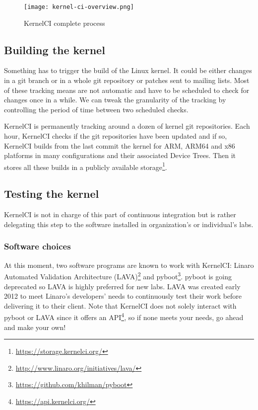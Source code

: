 \begin{figure}[H]
  \texttt{[image: kernel-ci-overview.png]}
  \caption{KernelCI complete process}
\end{figure}

\subsection{Building the kernel}

Something has to trigger the build of the Linux kernel. It could be either changes in a git branch or in a whole git repository or patches sent to mailing lists. Most of these tracking means are not automatic and have to be scheduled to check for changes once in a while. We can tweak the granularity of the tracking by controlling the period of time between two scheduled checks.

KernelCI is permanently tracking around a dozen of kernel git repositories. Each hour, KernelCI checks if the git repositories have been updated and if so, KernelCI builds from the last commit the kernel for ARM, ARM64 and x86 platforms in many configurations and their associated Device Trees. Then it stores all these builds in a publicly available storage\footnote{\url{https://storage.kernelci.org/}}.

\subsection{Testing the kernel}

KernelCI is not in charge of this part of continuous integration but is rather delegating this step to the software installed in organization's or individual's labs.

\subsubsection{Software choices}

At this moment, two software programs are known to work with KernelCI: Linaro Automated Validation Architecture (LAVA)\footnote{\url{http://www.linaro.org/initiatives/lava/}} and pyboot\footnote{\url{https://github.com/khilman/pyboot}}. pyboot is going deprecated so LAVA is highly preferred for new labs. LAVA was created early 2012 to meet Linaro's developers' needs to continuously test their work before delivering it to their client. Note that KernelCI does not solely interact with pyboot or LAVA since it offers an API\footnote{\url{https://api.kernelci.org/}}, so if none meets your needs, go ahead and make your own!

